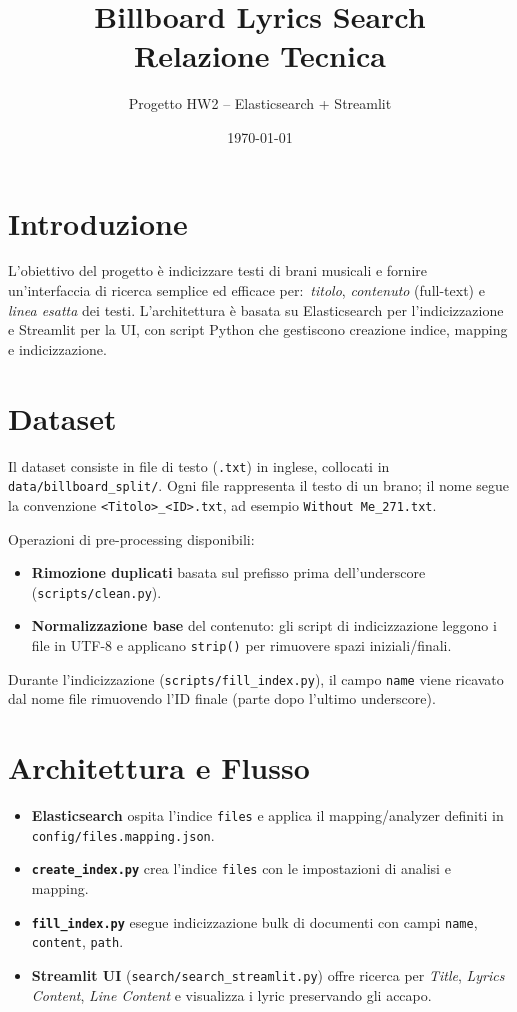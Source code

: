 \documentclass[a4paper,11pt]{article}
\title{Billboard Lyrics Search\\Relazione Tecnica}
\author{\small Progetto HW2 -- Elasticsearch + Streamlit}
\date{\today}
\begin{document}
\maketitle

\section{Introduzione}
L'obiettivo del progetto è indicizzare testi di brani musicali e fornire un'interfaccia di ricerca semplice ed efficace per:\ \emph{titolo}, \emph{contenuto} (full-text) e \emph{linea esatta} dei testi. L'architettura è basata su Elasticsearch per l'indicizzazione e Streamlit per la UI, con script Python che gestiscono creazione indice, mapping e indicizzazione.

\section{Dataset}
Il dataset consiste in file di testo (\texttt{.txt}) in inglese, collocati in \texttt{data/billboard\_split/}. Ogni file rappresenta il testo di un brano; il nome segue la convenzione \texttt{<Titolo>\_<ID>.txt}, ad esempio \texttt{Without Me\_271.txt}.\par
\smallskip
Operazioni di pre-processing disponibili:
\begin{itemize}[nosep]
  \item \textbf{Rimozione duplicati} basata sul prefisso prima dell'underscore (\texttt{scripts/clean.py}).
  \item \textbf{Normalizzazione base} del contenuto: gli script di indicizzazione leggono i file in UTF-8 e applicano \texttt{strip()} per rimuovere spazi iniziali/finali.
\end{itemize}
Durante l'indicizzazione (\texttt{scripts/fill\_index.py}), il campo \texttt{name} viene ricavato dal nome file rimuovendo l'ID finale (parte dopo l'ultimo underscore).

\section{Architettura e Flusso}
\begin{itemize}[nosep]
  \item \textbf{Elasticsearch} ospita l'indice \texttt{files} e applica il mapping/analyzer definiti in \texttt{config/files.mapping.json}.
  \item \textbf{\texttt{create\_index.py}} crea l'indice \texttt{files} con le impostazioni di analisi e mapping.
  \item \textbf{\texttt{fill\_index.py}} esegue indicizzazione bulk di documenti con campi \texttt{name}, \texttt{content}, \texttt{path}.
  \item \textbf{Streamlit UI} (\texttt{search/search\_streamlit.py}) offre ricerca per \emph{Title}, \emph{Lyrics Content}, \emph{Line Content} e visualizza i lyric preservando gli accapo.
\end{itemize}
\end{document}
